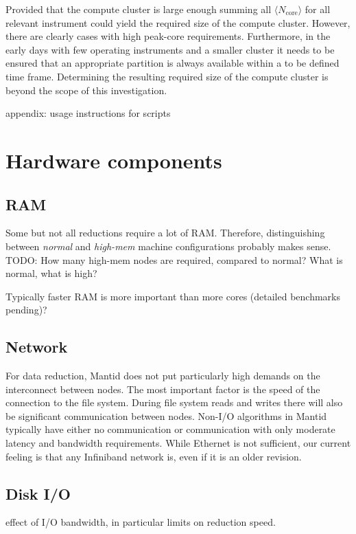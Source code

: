 \documentclass[a4paper,english,numbers=noenddot,bibliography=totoc,chapterprefix=on,DIV=12]{scrartcl}
\newcommand{\Ncoremean}{\langle N_{\text{core}}\rangle}
\newcommand{\mantid}{Mantid\xspace}
\begin{document}
Provided that the compute cluster is large enough summing all $\Ncoremean$ for all relevant instrument could yield the required size of the compute cluster.
However, there are clearly cases with high peak-core requirements.
Furthermore, in the early days with few operating instruments and a smaller cluster it needs to be ensured that an appropriate partition is always available within a to be defined time frame.
Determining the resulting required size of the compute cluster is beyond the scope of this investigation.

appendix: usage instructions for scripts

\section{Hardware components}

\subsection{RAM}

Some but not all reductions require a lot of RAM.
Therefore, distinguishing between \emph{normal} and \emph{high-mem} machine configurations probably makes sense.
TODO: How many high-mem nodes are required, compared to normal? What is normal, what is high?

Typically faster RAM is more important than more cores (detailed benchmarks pending)?

\subsection{Network}

For data reduction, \mantid does not put particularly high demands on the interconnect between nodes.
The most important factor is the speed of the connection to the file system.
During file system reads and writes there will also be significant communication between nodes.
Non-I/O algorithms in \mantid typically have either no communication or communication with only moderate latency and bandwidth requirements.
While Ethernet is not sufficient, our current feeling is that any Infiniband network is, even if it is an older revision.

\subsection{Disk I/O}

effect of I/O bandwidth, in particular limits on reduction speed.
\end{document}
